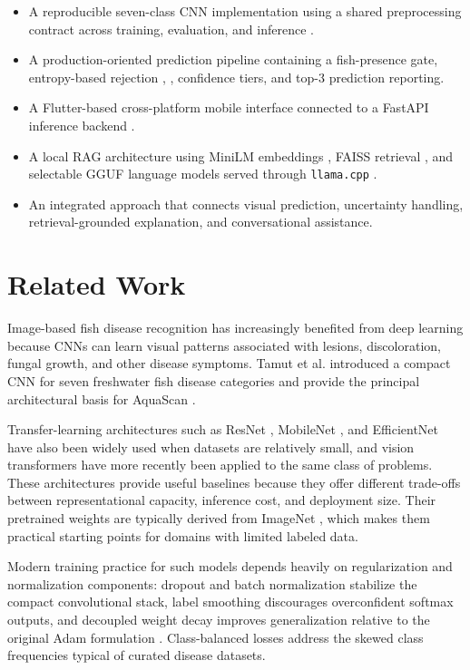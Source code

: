 \documentclass[conference]{IEEEtran}
\begin{document}
\begin{itemize}
    \item A reproducible seven-class CNN implementation using a shared preprocessing contract across training, evaluation, and inference \cite{b1}.
    \item A production-oriented prediction pipeline containing a fish-presence gate, entropy-based rejection \cite{b24}, \cite{b25}, confidence tiers, and top-3 prediction reporting.
    \item A Flutter-based cross-platform mobile interface \cite{b14} connected to a FastAPI inference backend \cite{b15}.
    \item A local RAG architecture \cite{b4} using MiniLM embeddings \cite{b5}, FAISS retrieval \cite{b6}, and selectable GGUF language models served through \texttt{llama.cpp} \cite{b13}.
    \item An integrated approach that connects visual prediction, uncertainty handling, retrieval-grounded explanation, and conversational assistance.
\end{itemize}



\section{Related Work}

Image-based fish disease recognition has increasingly benefited from deep learning because CNNs can learn visual patterns associated with lesions, discoloration, fungal growth, and other disease symptoms. Tamut et al. introduced a compact CNN for seven freshwater fish disease categories and provide the principal architectural basis for AquaScan \cite{b1}.

Transfer-learning architectures such as ResNet \cite{b8}, MobileNet \cite{b7}, and EfficientNet \cite{b9} have also been widely used when datasets are relatively small, and vision transformers \cite{b10} have more recently been applied to the same class of problems. These architectures provide useful baselines because they offer different trade-offs between representational capacity, inference cost, and deployment size. Their pretrained weights are typically derived from ImageNet \cite{b26}, which makes them practical starting points for domains with limited labeled data.

Modern training practice for such models depends heavily on regularization and normalization components: dropout \cite{b27} and batch normalization \cite{b28} stabilize the compact convolutional stack, label smoothing \cite{b29} discourages overconfident softmax outputs, and decoupled weight decay \cite{b11} improves generalization relative to the original Adam formulation \cite{b12}. Class-balanced losses \cite{b3} address the skewed class frequencies typical of curated disease datasets.
\end{document}
